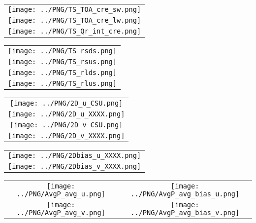 \documentclass{article}
\begin{document}
\clearpage

\begin{table}
  \begin{tabular}{c}
    \texttt{[image: ../PNG/TS\_TOA\_cre\_sw.png]}   \\
    \texttt{[image: ../PNG/TS\_TOA\_cre\_lw.png]}   \\
    \texttt{[image: ../PNG/TS\_Qr\_int\_cre.png]}
  \end{tabular}
\end{table}

\clearpage

\begin{table}
  \begin{tabular}{c}
    \texttt{[image: ../PNG/TS\_rsds.png]} \\
    \texttt{[image: ../PNG/TS\_rsus.png]} \\
    \texttt{[image: ../PNG/TS\_rlds.png]} \\
    \texttt{[image: ../PNG/TS\_rlus.png]} 
  \end{tabular}
\end{table}

\clearpage

\begin{table}
  \begin{tabular}{c}
    \texttt{[image: ../PNG/2D\_u\_CSU.png]}  \\
    \texttt{[image: ../PNG/2D\_u\_XXXX.png]} \\
    \texttt{[image: ../PNG/2D\_v\_CSU.png]}  \\
    \texttt{[image: ../PNG/2D\_v\_XXXX.png]}	  
  \end{tabular}
\end{table}

\clearpage

\begin{table}
  \begin{tabular}{c}
    \texttt{[image: ../PNG/2Dbias\_u\_XXXX.png]} \\
    \texttt{[image: ../PNG/2Dbias\_v\_XXXX.png]}	  
  \end{tabular}
\end{table}

\clearpage

\begin{table}
  \begin{tabular}{cc}
    \texttt{[image: ../PNG/AvgP\_avg\_u.png]} & \texttt{[image: ../PNG/AvgP\_avg\_bias\_u.png]} \\
    \texttt{[image: ../PNG/AvgP\_avg\_v.png]} & \texttt{[image: ../PNG/AvgP\_avg\_bias\_v.png]}
  \end{tabular}
\end{table}
\end{document}
